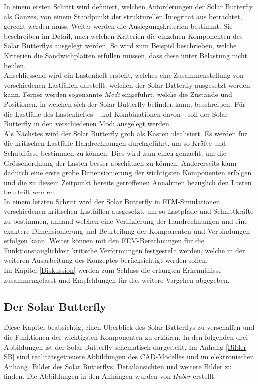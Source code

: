 In einem ersten Schritt wird definiert, welchen Anforderungen der Solar Butterfly als Ganzes, von einem Standpunkt der strukturellen Integrität aus betrachtet, gerecht werden muss. Weiter werden die Auslegungskriterien bestimmt. Sie beschreiben im Detail, nach welchen Kriterien die einzelnen Komponenten des Solar Butterflys ausgelegt werden. So wird zum Beispiel beschrieben, welche Kriterien die Sandwichplatten erfüllen müssen, dass diese unter Belastung nicht beulen.\\
Anschliessend wird ein Lastenheft erstellt, welches eine Zusammenstellung von verschiedenen Lastfällen darstellt, welchen der Solar Butterfly ausgesetzt werden kann. Ferner werden sogenannte \emph{Modi} eingeführt, welche die Zustände und Positionen, in welchen sich der Solar Butterfly befinden kann, beschreiben. Für die Lastfälle des Lastenheftes - und Kombinationen davon - soll der Solar Butterfly in den verschiedenen Modi ausgelegt werden.\\
Als Nächstes wird der Solar Butterfly grob als \glqq Kasten\grqq{} idealisiert. Es werden für die kritischen Lastfälle Handrechnungen durchgeführt, um so Kräfte und Schubflüsse bestimmen zu können. Dies wird zum einen gemacht, um die Grössenordnung der Lasten besser abschätzen zu können. Andererseits kann dadurch eine erste grobe Dimensionierung der wichtigsten Komponenten erfolgen und die zu diesem Zeitpunkt bereits getroffenen Annahmen bezüglich den Lasten beurteilt werden.\\
In einem letzten Schritt wird der Solar Butterfly in FEM-Simulationen verschiedenen kritischen Lastfällen ausgesetzt, um so Lastpfade und Schnittkräfte zu bestimmen, anhand welchen eine Verifizierung der Handrechnungen und eine exaktere Dimensionierung und Beurteilung der Komponenten und Verbindungen erfolgen kann. Weiter können mit den FEM-Berechnungen für die Funktionstauglichkeit kritische Verformungen festgestellt werden, welche in der weiteren Ausarbeitung des Konzeptes berücksichtigt werden sollen.\\
Im Kapitel \ref{Diskussion} werden zum Schluss die erlangten Erkenntnisse zusammengefasst und Empfehlungen für das weitere Vorgehen abgegeben.

\subsection{Der Solar Butterfly}
Diese Kapitel beabsichtig, einen Überblick des Solar Butterflys zu verschaffen und die Funktionen der wichtigsten Komponenten zu erklären.
In den folgenden drei Abbildungen ist der Solar Butterfly schematisch dargestellt. Im Anhang \ref{Bilder SB} sind realitätsgetreuere Abbildungen des CAD-Modelles und im elektronischen Anhang \ref{Bilder des Solar Butterflys} Detailansichten und weitere Bilder zu finden. Die Abbildungen in den Anhängen wurden von \emph{Huber} erstellt.

